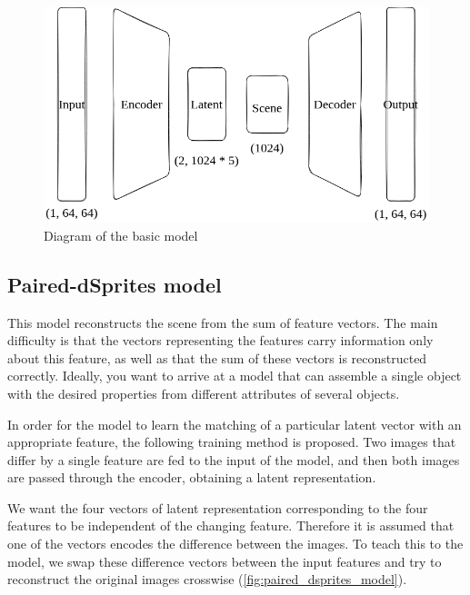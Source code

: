 \documentclass{article}
\begin{document}
    \begin{figure}[ht]
        \centering
        \includegraphics[width=0.6\linewidth]{img/model/basic_model}
        \caption{Diagram of the basic model}
        \label{fig:basic_model}

    \end{figure}

    \subsection{Paired-dSprites model}
    This model reconstructs the scene from the sum of feature vectors.
    The main difficulty is that the vectors representing the features carry
    information only about this feature, as well as that the sum of these
    vectors is reconstructed correctly. Ideally, you want to arrive at a
    model that can assemble a single object with the desired properties
    from different attributes of several objects.

    In order for the model to learn the matching of a particular latent vector
    with an appropriate feature, the following training method is proposed.
    Two images that differ by a single feature are fed to the input of the
    model, and then both images are passed through the encoder, obtaining
    a latent representation.

    We want the four vectors of latent representation corresponding to the
    four features to be independent of the changing feature. Therefore it
    is assumed that one of the vectors encodes the difference between the
    images. To teach this to the model, we swap these difference vectors
    between the input features and try to reconstruct the original images
    crosswise (\autoref{fig:paired_dsprites_model}).
\end{document}
